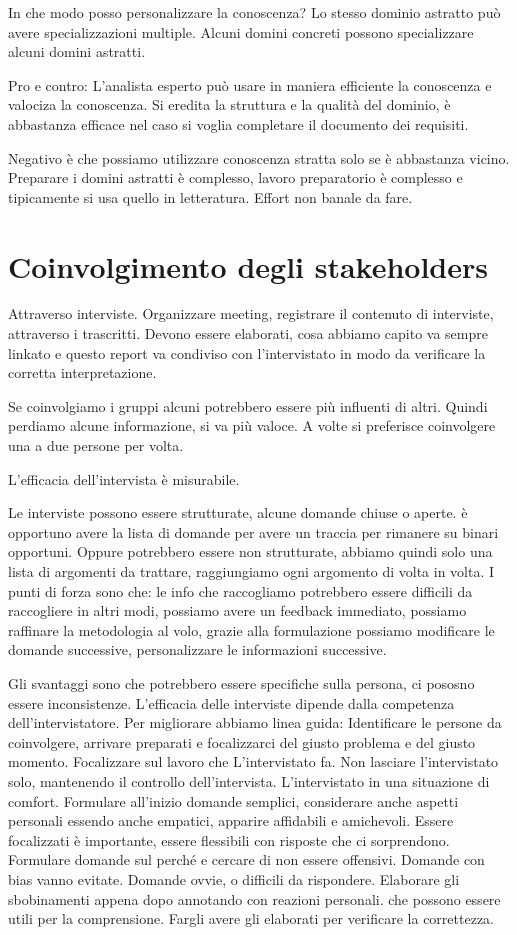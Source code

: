 \documentclass[oneside,a4paper,11pt]{book}
\theoremstyle{italicstyle}
\theoremstyle{normStyle}
\begin{document}
In che modo posso personalizzare la conoscenza?
Lo stesso dominio astratto può avere specializzazioni multiple.
Alcuni domini concreti possono specializzare alcuni domini astratti.

Pro e contro:
L'analista esperto può usare in maniera efficiente la conoscenza e 
valociza la conoscenza.
Si eredita la struttura e la qualità del dominio, è abbastanza efficace nel 
caso si voglia completare il documento dei requisiti.

Negativo è che possiamo utilizzare conoscenza stratta solo se è abbastanza vicino.
Preparare i domini astratti è complesso, lavoro preparatorio è complesso e tipicamente 
si usa quello in letteratura. Effort non banale da fare.

\section{Coinvolgimento degli stakeholders}
Attraverso interviste. Organizzare meeting, registrare il contenuto di 
interviste, attraverso i trascritti. Devono essere elaborati, 
cosa abbiamo capito va sempre linkato e questo report va condiviso con
l'intervistato in modo da verificare la corretta interpretazione.

Se coinvolgiamo i gruppi alcuni potrebbero essere più influenti di altri.
Quindi perdiamo alcune informazione, si va più valoce. A volte si preferisce coinvolgere 
una a due persone per volta.

L'efficacia dell'intervista è misurabile.

Le interviste possono essere strutturate, alcune domande chiuse 
o aperte. è opportuno avere la lista di domande per avere un traccia per 
rimanere su binari opportuni. Oppure potrebbero essere non strutturate,
abbiamo quindi solo una lista di argomenti da trattare, raggiungiamo ogni 
argomento di volta in volta.
I punti di forza sono che: le info che raccogliamo potrebbero essere difficili 
da raccogliere in altri modi, possiamo avere un feedback immediato, possiamo 
raffinare la metodologia al volo, grazie alla formulazione possiamo 
modificare le domande successive, personalizzare le informazioni successive.

Gli svantaggi sono che potrebbero essere specifiche sulla persona, ci pososno 
essere inconsistenze. L'efficacia delle interviste dipende dalla competenza dell'intervistatore.
Per migliorare abbiamo linea guida:
Identificare le persone da coinvolgere, arrivare preparati e focalizzarci del 
giusto problema e del giusto momento. Focalizzare sul lavoro che  L'intervistato 
fa. Non lasciare l'intervistato solo, mantenendo il controllo dell'intervista.
L'intervistato in una situazione di comfort. Formulare all'inizio domande semplici,
considerare anche aspetti personali essendo anche empatici, apparire affidabili e amichevoli.
Essere focalizzati è importante, essere flessibili con risposte che ci 
sorprendono. Formulare domande sul perché e cercare di non essere offensivi.
Domande con bias vanno evitate. Domande ovvie, o difficili da rispondere.
Elaborare gli sbobinamenti appena dopo annotando con reazioni personali. 
che possono essere utili per la comprensione. Fargli avere gli elaborati per 
verificare la correttezza.
\end{document}
